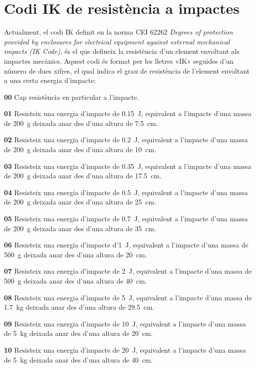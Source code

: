 \section{Codi IK de resistència a impactes}\label{sec:codi-IK}   

Actualment, el codi IK definit en la norma CEI 62262 \textit{Degrees of protection provided by enclosures for electrical equipment against external mechanical impacts (IK Code)}, és el que defineix la resistència d'un element  envoltant als impactes mecànics. Aquest codi és format per les lletres «IK» seguides d'un número de dues xifres, el qual indica el grau de resistència de l'element envoltant a una certa energia d'impacte:

\begin{list}{}
   {\setlength{\labelwidth}{10mm} \setlength{\leftmargin}{10mm} \setlength{\labelsep}{2mm}}
   \item[\textbf{00}] Cap resistència en particular a l'impacte.
   \item[\textbf{01}] Resisteix una energia d'impacte de \qty{0,15}{J}, equivalent a l'impacte d'una massa de \qty{200}{g} deixada anar des d'una altura de \qty{7,5}{cm}.
   \item[\textbf{02}] Resisteix una energia d'impacte de \qty{0,2}{J}, equivalent a l'impacte d'una massa de \qty{200}{g} deixada anar des d'una altura de \qty{10}{cm}.
   \item[\textbf{03}] Resisteix una energia d'impacte de \qty{0,35}{J}, equivalent a l'impacte d'una massa de \qty{200}{g} deixada anar des d'una altura de \qty{17,5}{cm}.
   \item[\textbf{04}] Resisteix una energia d'impacte de \qty{0,5}{J}, equivalent a l'impacte d'una massa de \qty{200}{g} deixada anar des d'una altura de \qty{25}{cm}.
   \item[\textbf{05}] Resisteix una energia d'impacte de \qty{0,7}{J}, equivalent a l'impacte d'una massa de \qty{200}{g} deixada anar des d'una altura de \qty{35}{cm}.
   \item[\textbf{06}]Resisteix una energia d'impacte d'\qty{1}{J}, equivalent a l'impacte d'una massa de \qty{500}{g} deixada anar des d'una altura de \qty{20}{cm}.
   \item[\textbf{07}]Resisteix una energia d'impacte de \qty{2}{J}, equivalent a l'impacte d'una massa de \qty{500}{g} deixada anar des d'una altura de \qty{40}{cm}.
   \item[\textbf{08}]Resisteix una energia d'impacte de \qty{5}{J}, equivalent a l'impacte d'una massa de \qty{1,7}{kg} deixada anar des d'una altura de \qty{29,5}{cm}.
   \item[\textbf{09}]Resisteix una energia d'impacte de \qty{10}{J}, equivalent a l'impacte d'una massa de \qty{5}{kg} deixada anar des d'una altura de \qty{20}{cm}.
   \item[\textbf{10}]Resisteix una energia d'impacte de \qty{20}{J}, equivalent a l'impacte d'una massa de \qty{5}{kg} deixada anar des d'una altura de \qty{40}{cm}.
\end{list}



